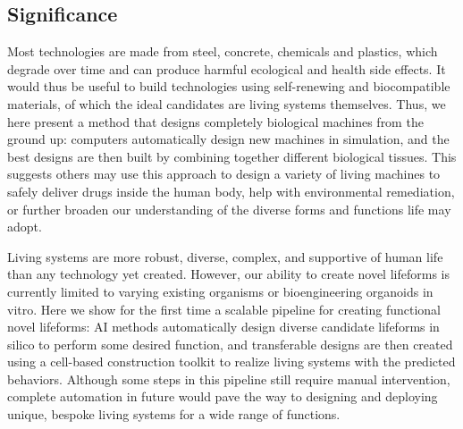 \subsection{Significance}
Most technologies are made from steel, concrete, chemicals and plastics, which degrade over time and can produce harmful ecological and health side effects. It would thus be useful to build technologies using self-renewing and biocompatible materials, of which the ideal candidates are living systems themselves. Thus, we here present a method that designs completely biological machines from the ground up: computers automatically design new machines in simulation, and the best designs are then built by combining together different biological tissues. This suggests others may use this approach to design a variety of living machines to safely deliver drugs inside the human body, help with environmental remediation, or further broaden our understanding of the diverse forms and functions life may adopt.

Living systems are more robust, diverse, complex, and supportive of human life than any technology yet created. However, our ability to create novel lifeforms is currently limited to varying existing organisms or bioengineering organoids in vitro. Here we show for the first time a scalable pipeline for creating functional novel lifeforms: AI methods automatically design diverse candidate lifeforms in silico to perform some desired function, and transferable designs are then created using a cell-based construction toolkit to realize living systems with the predicted behaviors. Although some steps in this pipeline still require manual intervention, complete automation in future would pave the way to designing and deploying unique, bespoke living systems for a wide range of functions.






